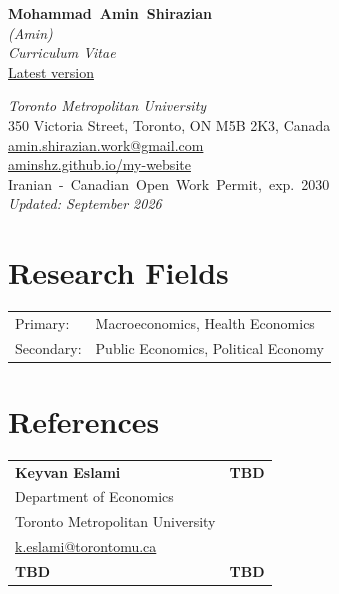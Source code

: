 \documentclass[11pt]{article}
\begin{document}
\noindent
\begin{minipage}[t]{0.52\textwidth}
  \vspace{0pt}
  {\fontsize{18}{21}\selectfont\bfseries\mbox{Mohammad Amin Shirazian}}\\[5pt]
  {\large\itshape (Amin)}\\[7pt]
  {\Large\itshape Curriculum Vitae}\\[3pt]
  {\footnotesize\href{https://aminshz.github.io/my-website/resume/resume.pdf}{Latest version}}
\end{minipage}%
\hfill
\begin{minipage}[t]{0.40\textwidth}
  \vspace{0pt}
  \raggedleft\small
  \textit{Toronto Metropolitan University}\\
  {\scriptsize 350 Victoria Street, Toronto, ON M5B 2K3, Canada}\\[3pt]
  \faEnvelope\enspace\href{mailto:amin.shirazian.work@gmail.com}{amin.shirazian.work@gmail.com}\\
  \faGlobe\enspace\href{https://aminshz.github.io/my-website}{aminshz.github.io/my-website}\\[3pt]
  {\scriptsize\mbox{Iranian - Canadian Open Work Permit, exp. 2030}}\\[1pt]
  \textit{Updated: September 2026}
\end{minipage}

\vspace{0.8em}

\section{Research Fields}

\begin{tabular}{@{}ll@{}}
  Primary: & Macroeconomics, Health Economics \\
  Secondary: & Public Economics, Political Economy
\end{tabular}

\section{References}

\begin{tabular}{p{7cm} p{7cm}}
  \textbf{Keyvan Eslami} & \textbf{TBD} \\
  Department of Economics & \\
  Toronto Metropolitan University & \\
  \href{mailto:k.eslami@torontomu.ca}{k.eslami@torontomu.ca} & \\[10pt]

  \textbf{TBD} & \textbf{TBD} \\
\end{tabular}
\end{document}
